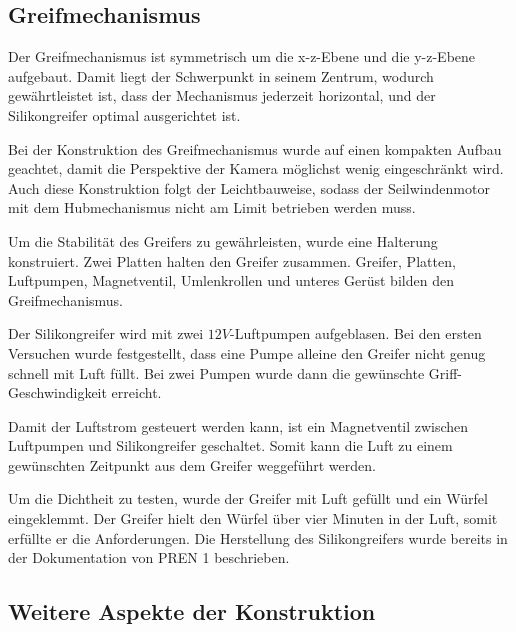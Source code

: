 \subsection{Greifmechanismus}

Der Greifmechanismus ist symmetrisch um die x-z-Ebene und die y-z-Ebene aufgebaut. Damit liegt der Schwerpunkt in seinem Zentrum, wodurch gewährtleistet ist, dass der Mechanismus jederzeit horizontal, und der Silikongreifer optimal ausgerichtet ist.

Bei der Konstruktion des Greifmechanismus wurde auf einen kompakten Aufbau geachtet, damit die Perspektive der Kamera möglichst wenig eingeschränkt wird. Auch diese Konstruktion folgt der Leichtbauweise, sodass der Seilwindenmotor mit dem Hubmechanismus nicht am Limit betrieben werden muss.

Um die Stabilität des Greifers zu gewährleisten, wurde eine Halterung konstruiert. Zwei Platten halten den Greifer zusammen. Greifer, Platten, Luftpumpen, Magnetventil, Umlenkrollen und unteres Gerüst bilden den Greifmechanismus.

Der Silikongreifer wird mit zwei $12V$-Luftpumpen aufgeblasen. Bei den ersten Versuchen wurde festgestellt, dass eine Pumpe alleine den Greifer nicht genug schnell mit Luft füllt. Bei zwei Pumpen wurde dann die gewünschte Griff-Geschwindigkeit erreicht.

Damit der Luftstrom gesteuert werden kann, ist ein Magnetventil zwischen Luftpumpen und Silikongreifer geschaltet. Somit kann die Luft zu einem gewünschten Zeitpunkt aus dem Greifer weggeführt werden.

Um die Dichtheit zu testen, wurde der Greifer mit Luft gefüllt und ein Würfel eingeklemmt. Der Greifer hielt den Würfel über vier Minuten in der Luft, somit erfüllte er die Anforderungen. Die Herstellung des Silikongreifers wurde bereits in der Dokumentation von PREN 1 \cite[S. 44-46]{pren1} beschrieben.

\subsection{Weitere Aspekte der Konstruktion}

